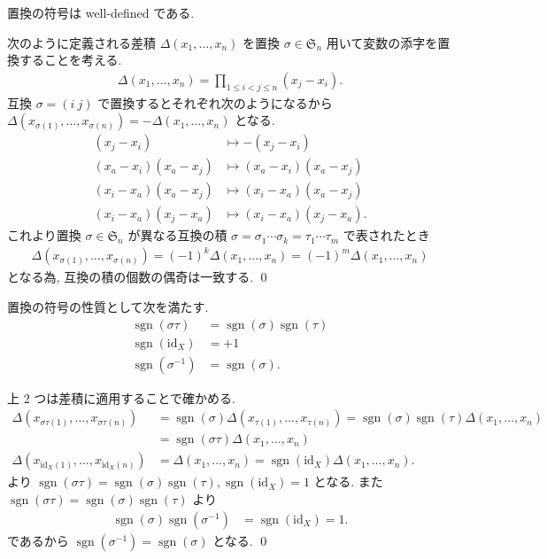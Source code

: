 \documentclass[uplatex,dvipdfmx,a4paper,11pt]{jlreq}
\makeatletter
\DeclareMathOperator{\sgn}{sgn}
\renewcommand{\SS}{\mathfrak{S}}
\newcommand{\id}{\mathrm{id}}
\numberwithin{equation}{section}
\theoremstyle{definition}
\renewenvironment{proof}[1][\proofname]{\par
  \normalfont
  \topsep6\p@\@plus6\p@ \trivlist
  \item[\hskip\labelsep{\bfseries #1}\@addpunct{\bfseries}]\ignorespaces\quad\par
}{%
  \qed\endtrivlist\@endpefalse
}
\renewcommand\proofname{証明}
\makeatother
\begin{document}
\begin{proposition}[Q21-7(ii)]
  置換の符号は well-defined である.
\end{proposition}
\begin{proof}
  次のように定義される差積 $\Delta(x_1,\ldots,x_n)$ を置換 $\sigma\in\SS_n$ 用いて変数の添字を置換することを考える.
  \begin{align}
    \Delta(x_1,\ldots,x_n) = \prod_{1\leq i<j\leq n}(x_j - x_i).
  \end{align}
  互換 $\sigma = (i\ j)$ で置換するとそれぞれ次のようになるから $\Delta(x_{\sigma(1)},\ldots,x_{\sigma(n)}) = -\Delta(x_1,\ldots,x_n)$ となる.
  \begin{align}
    (x_j - x_i)            & \mapsto -(x_j - x_i)            \\
    (x_a - x_i)(x_a - x_j) & \mapsto (x_a - x_i)(x_a - x_j)  \\
    (x_i - x_a)(x_a - x_j) & \mapsto (x_i - x_a)(x_a - x_j)  \\
    (x_i - x_a)(x_j - x_a) & \mapsto (x_i - x_a)(x_j - x_a).
  \end{align}
  これより置換 $\sigma\in\SS_n$ が異なる互換の積 $\sigma = \sigma_1\cdots\sigma_k = \tau_1\cdots\tau_m$ で表されたとき
  \begin{align}
    \Delta(x_{\sigma(1)},\ldots,x_{\sigma(n)}) = (-1)^k\Delta(x_1,\ldots,x_n) = (-1)^m\Delta(x_1,\ldots,x_n)
  \end{align}
  となる為, 互換の積の個数の偶奇は一致する.
\end{proof}

\begin{proposition}
  置換の符号の性質として次を満たす.
  \begin{align}
    \sgn(\sigma\tau)  & = \sgn(\sigma)\sgn(\tau) \\
    \sgn(\id_X)       & = +1                     \\
    \sgn(\sigma^{-1}) & = \sgn(\sigma).
  \end{align}
\end{proposition}
\begin{proof}
  上 2 つは差積に適用することで確かめる.
  \begin{align}
    \Delta(x_{\sigma\tau(1)},\ldots,x_{\sigma\tau(n)}) & = \sgn(\sigma)\Delta(x_{\tau(1)},\ldots,x_{\tau(n)}) = \sgn(\sigma)\sgn(\tau)\Delta(x_1,\ldots,x_n) \\
                                                       & = \sgn(\sigma\tau)\Delta(x_1,\ldots,x_n)                                                            \\
    \Delta(x_{\id_X(1)},\ldots,x_{\id_X(n)})           & = \Delta(x_1,\ldots,x_n) = \sgn(\id_X)\Delta(x_1,\ldots,x_n).
  \end{align}
  より $\sgn(\sigma\tau) = \sgn(\sigma)\sgn(\tau), \sgn(\id_X) = 1$ となる. また $\sgn(\sigma\tau) = \sgn(\sigma)\sgn(\tau)$ より
  \begin{align}
    \sgn(\sigma)\sgn(\sigma^{-1}) & = \sgn(\id_X) = 1.
  \end{align}
  であるから $\sgn(\sigma^{-1}) = \sgn(\sigma)$ となる.
\end{proof}
\end{document}
